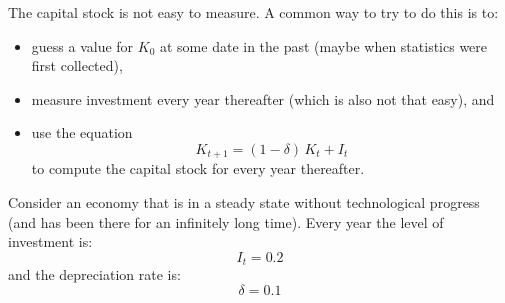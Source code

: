 

\noindent The capital stock is not easy to measure. A common way to try to do this is to:
\begin{itemize}[leftmargin=2.2em,topsep=2pt,itemsep=1pt]
\item guess a value for $K_0$ at some date in the past (maybe when statistics were first collected),
\item measure investment every year thereafter (which is also not that easy), and
\item use the equation
\[
K_{t+1}=(1-\delta)\,K_t+I_t \tag{5.5.1}
\]
to compute the capital stock for every year thereafter.
\end{itemize}
Consider an economy that is in a steady state without technological progress (and has been there for an infinitely long time).
Every year the level of investment is:
\[
I_t=0.2
\]
and the depreciation rate is:
\[
\delta=0.1
\]
